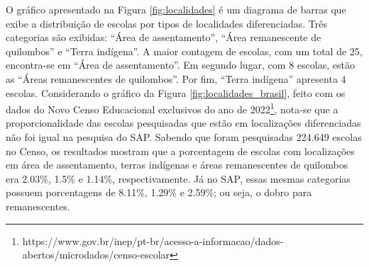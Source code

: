 

O gráfico apresentado na Figura \ref{fig:localidades} é um diagrama de barras que exibe a distribuição de escolas por tipos de localidades diferenciadas. Três categorias são exibidas: ``Área de assentamento'', ``Área remanescente de quilombos'' e ``Terra indígena''. A maior contagem de escolas, com um total de 25, encontra-se em ``Área de assentamento''. Em segundo lugar, com 8 escolas, estão as ``Áreas remanescentes de quilombos''. Por fim, ``Terra indígena'' apresenta 4 escolas. Considerando o gráfico da Figura \ref{fig:localidades_brasil}, feito com os dados do Novo Censo Educacional exclusivos do ano de 2022\footnote{https://www.gov.br/inep/pt-br/acesso-a-informacao/dados-abertos/microdados/censo-escolar}, nota-se que a proporcionalidade das escolas pesquisadas que estão em localizações diferenciadas não foi igual na pesquisa do SAP. Sabendo que foram pesquisadas 224.649 escolas no Censo, os resultados mostram que a porcentagem de escolas com localizações em área de assentamento, terras indígenas e áreas remanescentes de quilombos era 2.03\%, 1.5\% e 1.14\%, respectivamente. Já no SAP, essas mesmas categorias possuem porcentagens de 8.11\%, 1.29\% e 2.59\%; ou seja, o dobro para remanescentes.

